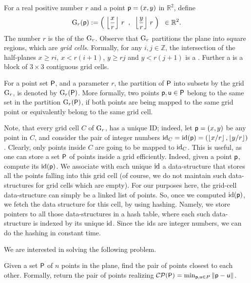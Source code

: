 For a real positive number $r$ and a point $\mathsf{p} = (x,y)$ in
$\mathbb{R}^2$, define 
\[
\Grid_r(\pnt) := \pth{\;\MakeVBig\floor{\frac{x}{r}} \, r \;\;,\;\;
   \floor{\frac{y}{r}} \, r \;} \;\; \in \Re^2.
\]
The number $r$ is the  of the 
$\mathrm{G}_r$. Observe that $\mathrm{G}_r$ partitions the plane into square
regions, which are \emph{grid cells}. Formally, for any
$i,j \in \mathbb{Z}$, the intersection of the half-planes
$x \geq r i$, $x < r(i+1)$, $y \geq r j$ and $y < r(j+1)$ is a
.  Further a  is a block of
$3\times 3$ contiguous grid cells.

For a point set ${\mathsf{P}}$, and a parameter $r$, the partition of
${\mathsf{P}}$ into subsets by the grid $\mathrm{G}_r$, is denoted by
$\mathrm{G}_r({\mathsf{P}})$. More formally, two points $\mathsf{p},\mathsf{u} \in {\mathsf{P}}$
belong to the same set in the partition $\mathrm{G}_r({\mathsf{P}})$, if both points
are being mapped to the same grid point or equivalently belong to the
same grid cell.

Note, that every grid cell $C$ of $\mathrm{G}_r$, has a unique ID; indeed,
let $\mathsf{p} = (x,y)$ be any point in $C$, and consider the pair of
integer numbers $\mathrm{id}_C = \mathrm{id}(\mathsf{p}) = (\left\lfloor {x/r} \right\rfloor,
\left\lfloor {y/r} \right\rfloor)$. Clearly, only points inside $C$ are going to be mapped
to $\mathrm{id}_C$. This is useful, as one can store a set ${\mathsf{P}}$ of points
inside a grid efficiently.  Indeed, given a point $\mathsf{p}$, compute its
$\mathrm{id}(\mathsf{p})$. We associate with each unique $\mathrm{id}$ a data-structure that
stores all the points falling into this grid cell (of course, we do
not maintain such data-structures for grid cells which are empty).
For our purposes here, the grid-cell data-structure can simply be a
linked list of points.  So, once we computed $\mathrm{id}(\mathsf{p})$, we fetch the
data structure for this cell, by using hashing.  Namely, we store
pointers to all those data-structures in a hash table, where each such
data-structure is indexed by its unique $\mathrm{id}$.  Since the $\mathrm{id}$s are
integer numbers, we can do the hashing in constant time.

\bigskip

We are interested in solving the following problem.
\begin{problem}
    Given a set ${\mathsf{P}}$ of $n$ points in the plane, find the pair of
    points closest to each other. Formally, return the pair of points
    realizing
    $\mathcal{CP}({\mathsf{P}}) = \min_{\mathsf{p},\mathsf{u} \in P}
    \left\| {\mathsf{p} - \mathsf{u}} \right\|$.
\end{problem}

